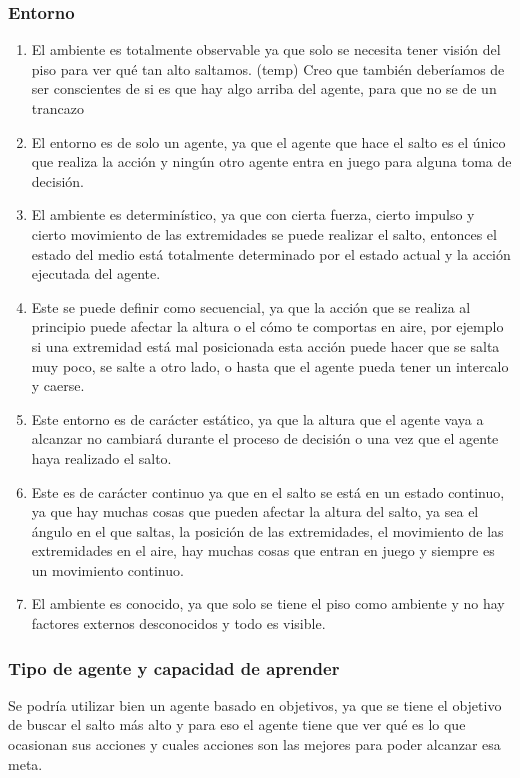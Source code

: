 \documentclass{article}
\begin{document}
            \subsubsection{Entorno}
                \begin{enumerate}
                    \item El ambiente es totalmente observable ya que solo se necesita tener visión del piso para ver qué tan alto saltamos. (temp) Creo que también deberíamos de ser conscientes de si es que hay algo arriba del agente, para que no se de un trancazo
                    \item El entorno es de solo un agente, ya que el agente que hace el salto es el único que realiza la acción y ningún otro agente entra en juego para alguna toma de decisión.
                    \item El ambiente es determinístico, ya que con cierta fuerza, cierto impulso y cierto movimiento de las extremidades se puede realizar el salto, entonces el estado del medio está totalmente determinado por el estado actual y la acción ejecutada del agente. 
                    \item Este se puede definir como secuencial, ya que la acción que se realiza al principio puede afectar la altura o el cómo te comportas en aire, por ejemplo si una extremidad está mal posicionada esta acción puede hacer que se salta muy poco, se salte a otro lado, o hasta que el agente pueda tener un intercalo y caerse.
                    \item Este entorno es de carácter estático, ya que la altura que el agente vaya a alcanzar no cambiará durante el proceso de decisión o una vez que el agente haya realizado el salto.
                    \item Este es de carácter continuo ya que en el salto se está en un estado continuo, ya que hay muchas cosas que pueden afectar la altura del salto, ya sea el ángulo en el que saltas, la posición de las extremidades, el movimiento de las extremidades en el aire, hay muchas cosas que entran en juego y siempre es un movimiento continuo. 
                    \item El ambiente es conocido, ya que solo se tiene el piso como ambiente y no hay factores externos desconocidos y todo es visible. 
                \end{enumerate}

            \subsubsection{Tipo de agente y capacidad de aprender}
                Se podría utilizar bien un agente basado en objetivos, ya que se tiene el objetivo de buscar el salto más alto y para eso el agente tiene que ver qué es lo que ocasionan sus acciones y cuales acciones son las mejores para poder alcanzar esa meta. 
                
\end{document}
